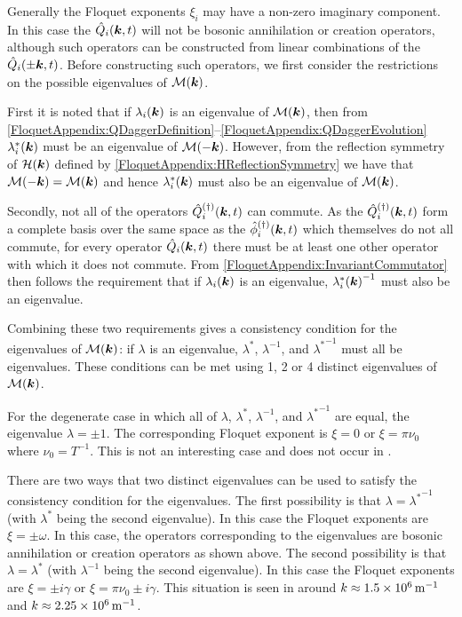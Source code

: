 Generally the Floquet exponents $\xi_i$ may have a non-zero imaginary component. In this case the $\hat{Q}_i(\bm{k}, t)$ will not be bosonic annihilation or creation operators, although such operators can be constructed from linear combinations of the $\hat{Q}_i(\pm\bm{k}, t)$. Before constructing such operators, we first consider the restrictions on the possible eigenvalues of $\mathcal{M}(\bm{k})$.

First it is noted that if $\lambda_i(\bm{k})$ is an eigenvalue of $\mathcal{M}(\bm{k})$, then from \eqref{FloquetAppendix:QDaggerDefinition}--\eqref{FloquetAppendix:QDaggerEvolution} $\lambda_i^*(\bm{k})$ must be an eigenvalue of $\mathcal{M}(-\bm{k})$. However, from the reflection symmetry of $\mathcal{H}(\bm{k})$ defined by \eqref{FloquetAppendix:HReflectionSymmetry} we have that $\mathcal{M}(-\bm{k}) = \mathcal{M}(\bm{k})$ and hence $\lambda_i^*(\bm{k})$ must also be an eigenvalue of $\mathcal{M}(\bm{k})$.

Secondly, not all of the operators $\hat{Q}_i^{(\dagger)}(\bm{k}, t)$ can commute. As the $\hat{Q}_i^{(\dagger)}(\bm{k}, t)$ form a complete basis over the same space as the $\hat{\phi}_i^{(\dagger)}(\bm{k}, t)$ which themselves do not all commute, for every operator $\hat{Q}_i(\bm{k}, t)$ there must be at least one other operator with which it does not commute. From \eqref{FloquetAppendix:InvariantCommutator} then follows the requirement that if $\lambda_i(\bm{k})$ is an eigenvalue,   ${\lambda_i^*(\bm{k})}^{-1}$ must also be an eigenvalue.

Combining these two requirements gives a consistency condition for the eigenvalues of $\mathcal{M}(\bm{k})$: if $\lambda$ is an eigenvalue, $\lambda^*$, $\lambda^{-1}$, and ${\lambda^*}^{-1}$ must all be eigenvalues. These conditions can be met using 1, 2 or 4 distinct eigenvalues of $\mathcal{M}(\bm{k})$.

For the degenerate case in which all of $\lambda$, $\lambda^*$, $\lambda^{-1}$, and ${\lambda^*}^{-1}$ are equal, the eigenvalue $\lambda = \pm 1$. The corresponding Floquet exponent is $\xi = 0$ or $\xi = \pi\nu_0$ where $\displaystyle \nu_0 = T^{-1}$. This is not an interesting case and does not occur in .

There are two ways that two distinct eigenvalues can be used to satisfy the consistency condition for the eigenvalues. The first possibility is that $\lambda = {\lambda^*}^{-1}$ (with $\lambda^*$ being the second eigenvalue). In this case the Floquet exponents are $\xi = \pm \omega$. In this case, the operators corresponding to the eigenvalues are bosonic annihilation or creation operators as shown above. The second possibility is that $\lambda = \lambda^*$ (with $\lambda^{-1}$ being the second eigenvalue). In this case the Floquet exponents are $\xi = \pm i\gamma$ or $\xi = \pi \nu_0 \pm i\gamma$. This situation is seen in  around $k \approx \unit[1.5 \times 10^6]{m}^{-1}$ and $k \approx \unit[2.25 \times 10^6]{m}^{-1}$.

